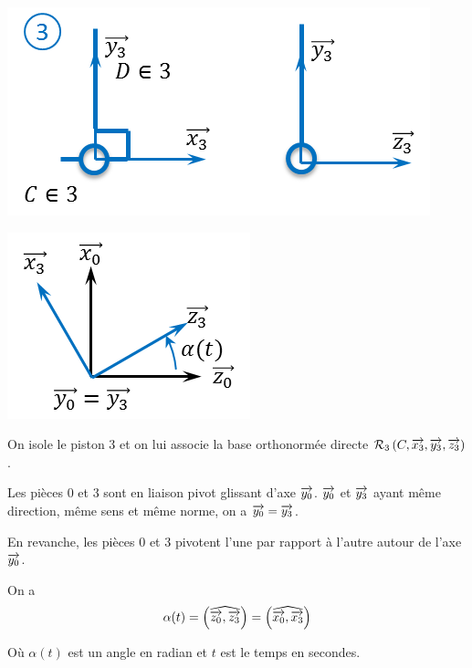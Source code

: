 \documentclass[10pt,oneside]{article}
\begin{document}
\begin{minipage}[c]{.4\linewidth}
\begin{center}
\includegraphics[width=\textwidth]{png/piece_3}

\includegraphics[width=.6\textwidth]{png/rep_3}
\end{center}
\end{minipage}\hfill
\begin{minipage}[c]{.55\linewidth}
On isole le piston 3 et on lui associe la base orthonormée directe $\mathcal{R}_3 \left(C,\overrightarrow{x_3},\overrightarrow{y_3},\overrightarrow{z_3}\right)$. 

Les pièces 0 et 3 sont en liaison pivot glissant d'axe $\overrightarrow{y_0}$. $\overrightarrow{y_0}$ et $\overrightarrow{y_3}$ ayant même direction, même sens et même norme, on a $\overrightarrow{y_0}=\overrightarrow{y_3}$.

En revanche, les pièces 0 et 3 pivotent l'une par rapport à l'autre autour de l'axe $\overrightarrow{y_0}$.

On a 
$$\alpha(t)
=\left(\widehat{\overrightarrow{z_0},\overrightarrow{z_3}}\right) 
=\left(\widehat{\overrightarrow{x_0},\overrightarrow{x_3}}\right) 
$$

Où $\alpha(t)$ est un angle en radian et $t$ est le temps en secondes. 


\end{minipage}
\end{document}
